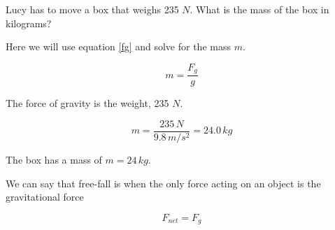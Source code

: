 \documentclass[12pt]{book}
\begin{document}
\linespace

\example

Lucy has to move a box that weighs 235 $N$. What is the mass of the box in kilograms?

\hspace{10pt}

Here we will use equation \ref{fg} and solve for the mass $m$.

\begin{equation}
m = \frac{F_g}{g}
\end{equation}

The force of gravity is the weight, 235 $N$.

\begin{equation}
m = \frac{235 \, N}{9.8 \, m/s^2} = 24.0 \, kg
\end{equation}

The box has a mass of $m = 24 \, kg$.

\linespace

We can say that free-fall is when the only force acting on an object is the gravitational force

\begin{equation}
F_{net} = F_{g}
\end{equation}
\end{document}
